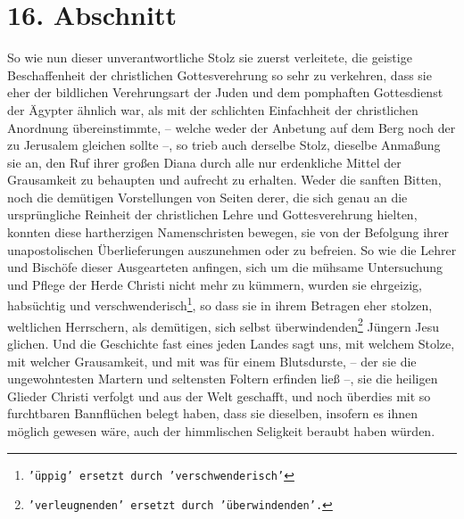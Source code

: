 \section{16. Abschnitt} \label{kap7_ab16}

So wie nun dieser unverantwortliche Stolz sie zuerst verleitete, die geistige
Beschaffenheit der christlichen Gottesverehrung so sehr
zu verkehren, dass sie
eher der bildlichen Verehrungsart der Juden und dem
pomphaften Gottesdienst
der Ägypter ähnlich war, als mit der schlichten
Einfachheit der christlichen
Anordnung übereinstimmte, -- welche weder der Anbetung auf dem Berg noch der zu
Jerusalem gleichen sollte --, so trieb auch derselbe
Stolz, dieselbe
Anmaßung sie an, den Ruf ihrer großen Diana durch alle
nur erdenkliche
Mittel der Grausamkeit zu behaupten und aufrecht zu erhalten. Weder die sanften
Bitten, noch die demütigen Vorstellungen von Seiten derer, die sich genau an
die ursprüngliche Reinheit der christlichen Lehre und
Gottesverehrung hielten,
konnten diese hartherzigen Namenschristen
bewegen, sie von der Befolgung ihrer
unapostolischen Überlieferungen
auszunehmen oder zu befreien. So wie die Lehrer
und Bischöfe dieser Ausgearteten anfingen, sich um die
mühsame Untersuchung und
Pflege der Herde Christi nicht mehr zu kümmern, wurden sie ehrgeizig,
habsüchtig und verschwenderisch\footnote{\texttt{'üppig' ersetzt durch
'verschwenderisch'}}, so dass sie in ihrem Betragen eher stolzen, weltlichen
Herrschern, als demütigen, sich selbst
überwindenden\footnote{\texttt{'verleugnenden' ersetzt durch 'überwindenden'.}}
Jüngern Jesu glichen.
Und die Geschichte fast eines jeden Landes sagt uns, mit welchem Stolze, mit
welcher Grausamkeit, und mit was für einem Blutsdurste, --
der sie die
ungewohntesten Martern und seltensten Foltern erfinden
ließ --, sie die
heiligen Glieder Christi
verfolgt und aus der Welt geschafft, und noch
überdies mit so furchtbaren Bannflüchen belegt haben, dass
sie
dieselben,
insofern es ihnen möglich gewesen wäre, auch der himmlischen
Seligkeit beraubt
haben würden.

\medskip

